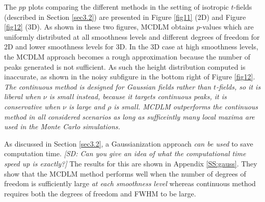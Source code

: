 \documentclass{article}
\newcommand{\sdcom}[1]{\textit{\color{red} [SD: #1]}}
\newcommand{\nt}[1]{\textit{\color{red} #1}}
\begin{document}
The $pp$ plots comparing the different methods in the setting of isotropic $t$-fields (described in Section \ref{sec3.2}) are presented in Figure \ref{fig11} (2D) and Figure \ref{fig12} (3D). As shown in these two figures, MCDLM obtains $p$-values which are uniformly distributed at all smoothness levels and different degrees of freedom for 2D and lower smoothness levels for 3D. In the 3D case at high smoothness levels, the MCDLM approach becomes a rough approximation because the number of peaks generated is not sufficient. As such the height distribution computed is inaccurate, as shown in the noisy subfigure in the bottom right of Figure \ref{fig12}. \nt{The continuous method is designed for Gaussian fields rather than $t$-fields, so it is liberal when $\nu$ is small instead, because it targets continuous peaks, it is conservative when $\nu$ is large and $\rho$ is small. MCDLM outperforms the continuous method in all considered scenarios as long as sufficeintly many local maxima are used in the Monte Carlo simulations.}

As discussed in Section \ref{sec3.2}, a Gaussianization approach \nt{can be used} to save computation time. \sdcom{Can you give an idea of what the computational time speed up is exactly?} The results for this are shown in Appendix \ref{SS:gauss}. They show that the MCDLM method performs well when the number of degrees of freedom is sufficiently large \nt{at each smoothness level} whereas continuous method requires both the degrees of freedom and FWHM to be large.
\end{document}
